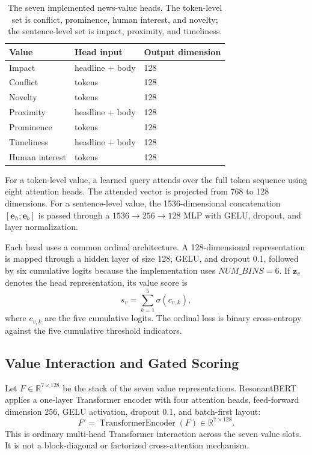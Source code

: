 \documentclass[11pt]{article}
\begin{document}
\begin{table}[t]
\centering
\small
\begin{tabular}{lll}
\toprule
\textbf{Value} & \textbf{Head input} & \textbf{Output dimension} \\
\midrule
Impact & headline + body & 128 \\
Conflict & tokens & 128 \\
Novelty & tokens & 128 \\
Proximity & headline + body & 128 \\
Prominence & tokens & 128 \\
Timeliness & headline + body & 128 \\
Human interest & tokens & 128 \\
\bottomrule
\end{tabular}
\caption{The seven implemented news-value heads. The token-level set is conflict, prominence, human interest, and novelty; the sentence-level set is impact, proximity, and timeliness.}
\label{tab:values}
\end{table}

For a token-level value, a learned query attends over the full token sequence using eight attention heads. The attended vector is projected from 768 to 128 dimensions. For a sentence-level value, the 1536-dimensional concatenation $[\mathbf{e}_h;\mathbf{e}_b]$ is passed through a $1536\rightarrow256\rightarrow128$ MLP with GELU, dropout, and layer normalization.

Each head uses a common ordinal architecture. A 128-dimensional representation is mapped through a hidden layer of size 128, GELU, and dropout 0.1, followed by six cumulative logits because the implementation uses $NUM\_BINS=6$. If $\mathbf{z}_v$ denotes the head representation, its value score is
\begin{equation}
    s_v = \sum_{k=1}^{5}\sigma(c_{v,k}),
\end{equation}
where $c_{v,k}$ are the five cumulative logits. The ordinal loss is binary cross-entropy against the five cumulative threshold indicators.

\subsection{Value Interaction and Gated Scoring}

Let $F \in \mathbb{R}^{7\times128}$ be the stack of the seven value representations. ResonantBERT applies a one-layer Transformer encoder with four attention heads, feed-forward dimension 256, GELU activation, dropout 0.1, and batch-first layout:
\begin{equation}
    F' = \operatorname{TransformerEncoder}(F) \in \mathbb{R}^{7\times128}.
\end{equation}
This is ordinary multi-head Transformer interaction across the seven value slots. It is not a block-diagonal or factorized cross-attention mechanism.
\end{document}

